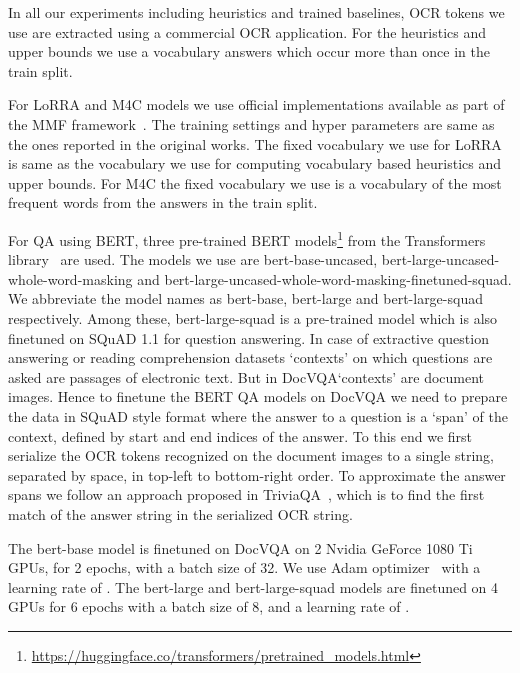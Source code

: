\documentclass[10pt,twocolumn,letterpaper]{article}
\newcommand{\datasetName}{DocVQA\xspace}
\newcommand{\squad}{SQuAD 1.1\xspace}
\newcommand{\lorra}{LoRRA\xspace}
\newcommand{\mc}{M4C\xspace}
\begin{document}
In all our experiments including heuristics and trained baselines, OCR tokens we use are extracted using a commercial OCR application.
For the heuristics and upper bounds we use a vocabulary  answers which occur more than once in the train split.


For \lorra and \mc models we use official implementations available as part of the MMF framework~\cite{mmf}. The training settings and hyper parameters are same as the ones reported in the original works. The fixed vocabulary we use for \lorra is same as the vocabulary we use for computing vocabulary based heuristics and upper bounds. For \mc the fixed vocabulary we use is  a vocabulary of the  most frequent words from the answers in the train split.

For QA using BERT, three pre-trained BERT models\footnote{\url{https://huggingface.co/transformers/pretrained_models.html}} from the Transformers library~\cite{huggingface} are used. The models we use are bert-base-uncased, bert-large-uncased-whole-word-masking and bert-large-uncased-whole-word-masking-finetuned-squad. We abbreviate the model names as bert-base, bert-large and bert-large-squad respectively.
Among these, bert-large-squad is a  pre-trained model which is also finetuned on \squad for question answering. 
In case of extractive question answering or reading comprehension datasets `contexts' on which questions are asked are passages of electronic text. But in \datasetName  `contexts' are document images.
Hence to finetune the BERT QA models on \datasetName we need to prepare the data in SQuAD style format where the answer to a question is a `span' of the context, defined by start and end indices of the answer. To this end we first serialize the OCR tokens recognized on the document images to a single string, separated by space, in top-left to bottom-right order. To approximate the answer spans we follow an approach proposed in TriviaQA~\cite{triviaqa}, which is to find the first match of the answer string in the serialized OCR string.


The bert-base model is finetuned on \datasetName on 2 Nvidia GeForce 1080 Ti GPUs, for 2 epochs, with a batch size of 32.
We use Adam optimizer~\cite{adam} with a learning rate of .
The bert-large and bert-large-squad models are finetuned on 4 GPUs for 6 epochs with a batch size of 8, and a learning rate of .
\end{document}
